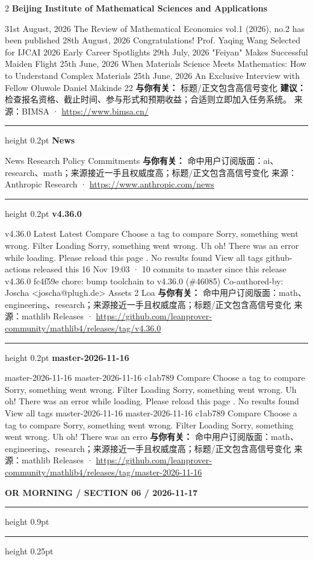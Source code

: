 \documentclass[10.5pt]{ctexart}
\begin{document}
\begin{multicols}{2}
{\large\bfseries Beijing Institute of Mathematical Sciences and Applications}\par
31st August, 2026 The Review of Mathematical Economics vol.1 (2026), no.2 has been published 28th August, 2026 Congratulations! Prof. Yaqing Wang Selected for IJCAI 2026 Early Career Spotlights 29th July, 2026 "Feiyan" Makes Successful Maiden Flight 25th June, 2026 When Materials Science Meets Mathematics: How to Understand Complex Materials 25th June, 2026 An Exclusive Interview with Fellow Oluwole Daniel Makinde 22
\textbf{与你有关：} 标题/正文包含高信号变化
\textbf{建议：} 检查报名资格、截止时间、参与形式和预期收益；合适则立即加入任务系统。
{\footnotesize\color{ormuted} 来源：BIMSA · \url{https://www.bimsa.cn/}}
\vspace{2mm}
\hrule height 0.2pt
\vspace{2mm}
{\large\bfseries News}\par
News Research Policy Commitments
\textbf{与你有关：} 命中用户订阅版面：ai、research、math；来源接近一手且权威度高；标题/正文包含高信号变化
{\footnotesize\color{ormuted} 来源：Anthropic Research · \url{https://www.anthropic.com/news}}
\vspace{2mm}
\hrule height 0.2pt
\vspace{2mm}
{\large\bfseries v4.36.0}\par
v4.36.0 Latest Latest Compare Choose a tag to compare Sorry, something went wrong. Filter Loading Sorry, something went wrong. Uh oh! There was an error while loading. Please reload this page . No results found View all tags github-actions released this 16 Nov 19:03 · 10 commits to master since this release v4.36.0 fc4f59e chore: bump toolchain to v4.36.0 (\#46085) Co-authored-by: Joscha <joscha@plugh.de> Assets 2 Loa
\textbf{与你有关：} 命中用户订阅版面：math、engineering、research；来源接近一手且权威度高；标题/正文包含高信号变化
{\footnotesize\color{ormuted} 来源：mathlib Releases · \url{https://github.com/leanprover-community/mathlib4/releases/tag/v4.36.0}}
\vspace{2mm}
\hrule height 0.2pt
\vspace{2mm}
{\large\bfseries master-2026-11-16}\par
master-2026-11-16 master-2026-11-16 c1ab789 Compare Choose a tag to compare Sorry, something went wrong. Filter Loading Sorry, something went wrong. Uh oh! There was an error while loading. Please reload this page . No results found View all tags master-2026-11-16 master-2026-11-16 c1ab789 Compare Choose a tag to compare Sorry, something went wrong. Filter Loading Sorry, something went wrong. Uh oh! There was an erro
\textbf{与你有关：} 命中用户订阅版面：math、engineering、research；来源接近一手且权威度高；标题/正文包含高信号变化
{\footnotesize\color{ormuted} 来源：mathlib Releases · \url{https://github.com/leanprover-community/mathlib4/releases/tag/master-2026-11-16}}
\end{multicols}
\newpage
{\small\bfseries OR MORNING / SECTION 06 / 2026-11-17}
\vspace{2mm}
\hrule height 0.9pt
\vspace{1.5mm}
\hrule height 0.25pt
\vspace{4mm}
\end{document}
